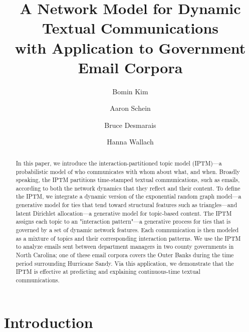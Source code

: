 \documentclass[a4paper]{article}
\title{A Network Model for Dynamic Textual Communications \\with Application to
	Government Email Corpora}
\author[1]{Bomin Kim}
\author[3]{Aaron Schein}
\author[1]{Bruce Desmarais}
\author[2,3]{Hanna Wallach}
\affil[1]{Pennsylvania State University}
\affil[2]{Microsoft Research NYC}
\affil[3]{University of Massachusetts Amherst}
\begin{document}
\setlength{\parindent}{0pt}
\maketitle
\begin{abstract}
	
	\noindent In this paper, we introduce the interaction-partitioned topic model
	(IPTM)---a probabilistic model of who communicates with whom about
	what, and when. Broadly speaking, the IPTM partitions time-stamped
	textual communications, such as emails, according to both the network
	dynamics that they reflect and their content. To define the IPTM, we
	integrate a dynamic version of the exponential random graph model---a
	generative model for ties that tend toward structural features such as
	triangles---and latent Dirichlet allocation---a generative model for
	topic-based content. The IPTM assigns each topic to an "interaction
	pattern"---a generative process for ties that is governed by a set of
	dynamic network features. Each communication is then modeled as a
	mixture of topics and their corresponding interaction patterns. We use
	the IPTM to analyze emails sent between department managers in two
	county governments in North Carolina; one of these email corpora
	covers the Outer Banks during the time period surrounding Hurricane
	Sandy. Via this application, we demonstrate that the IPTM is effective
	at predicting and explaining continuous-time textual communications.
\end{abstract}
\section{Introduction} \label{sec: Introduction}
\end{document}
